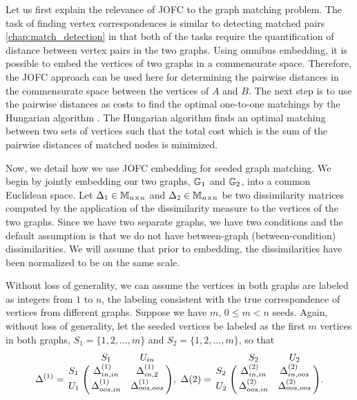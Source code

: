 \documentclass[12pt,oneside,final]{thesis}\usepackage[]{graphicx}\usepackage[]{color}
\begin{document}
Let us first explain the relevance of JOFC to the graph matching problem. The  task of finding vertex correspondences is similar to  detecting matched pairs \ref{chap:match_detection} in that both of the tasks require the quantification of distance between vertex pairs  in the two graphs.
Using omnibus  embedding, it is possible to embed the vertices of two graphs in a commensurate space.
Therefore, the JOFC approach can be used here for determining the pairwise distances in the commensurate space between  the vertices of $A$ and $B$.
The next step is to use the pairwise distances as costs to find the optimal one-to-one matchings by the Hungarian algorithm \cite{Hung-algo}. The Hungarian algorithm finds an optimal matching between two sets of vertices such that the total  cost which is the sum of the pairwise distances of matched nodes is minimized.

Now, we detail how we use JOFC embedding for seeded graph matching. We begin by jointly embedding our two graphs, $\mathbb{G}_1$ and $\mathbb{G}_2$, into a common Euclidean space. Let $\Delta_1\in \mathbb{M}_{n \times n}$ and $\Delta_2\in \mathbb{M}_{n \times n}$ be two dissimilarity matrices computed by the application of the dissimilarity measure to the vertices of the two graphs. Since we have two separate graphs, we have two conditions and the default assumption is that we do not have  between-graph (between-condition) dissimilarities. We will assume that prior to embedding, the dissimilarities have been normalized to be on the same scale.

Without loss of generality, we can assume the vertices in both graphs are labeled as integers  from $1$ to $n$, the labeling consistent with the true correspondence  of vertices from different graphs. Suppose we have $m,\, 0 \leq m <n$ seeds. Again, without loss of generality, let the seeded vertices be labeled  as the first $m$ vertices in both graphs, $S_1=\{1,2,\ldots,m\}$ and $S_2=\{1,2,\ldots,m\}$, so that 
$$\Delta^{(1)}=\bordermatrix{&S_{1}&U_{in}\cr
                S_1&\gD^{(1)}_{{in},{in}} 
                & \gD^{(1)}_{{in},2}  \cr
                U_1& \gD^{(1)}_{{oos},{in}}  
                &  \gD^{(1)}_{{oos},{oos}}},\,\,
                \Delta{(2)}=\bordermatrix{&S_2&U_2\cr
                S_2&\gD^{(2)}_{{in},{in}} 
                & \gD^{(2)}_{{in},{oos}}  \cr
                U_2& \gD^{(2)}_{{oos},{in}}  
                &  \gD^{(2)}_{{oos},{oos}}}.$$
\end{document}
